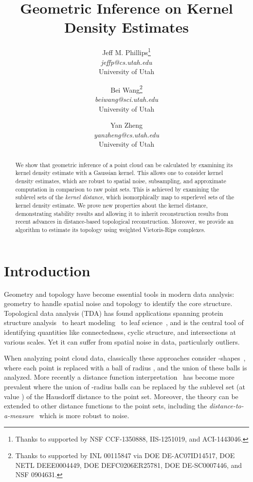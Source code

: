 \documentclass[11pt]{myclass}
\title{Geometric Inference on Kernel Density Estimates}
\author{
Jeff M. Phillips\thanks{Thanks to supported by NSF CCF-1350888, IIS-1251019, and ACI-1443046.}
     \\ {\small\textsl{jeffp@cs.utah.edu}} \\  {\small University of Utah} \and 
Bei Wang\thanks{Thanks to supported by  INL 00115847 via DOE DE-AC07ID14517, 
                                                            DOE NETL DEEE0004449, 
                                                            DOE DEFC0206ER25781, 
                                                            DOE DE-SC0007446, and
                                                            NSF 0904631.}
      \\ {\small\textsl{beiwang@sci.utah.edu}} \\  {\small University of Utah} \and
Yan Zheng \\ {\small\textsl{yanzheng@cs.utah.edu}} \\  {\small University of Utah}
}
\begin{document}
\begin{titlepage}
\maketitle 
\begin{abstract}
We show that geometric inference of a point cloud can be calculated by examining its kernel density estimate with a Gaussian kernel.  This allows one to consider kernel density estimates, which are robust to spatial noise, subsampling, and approximate computation in comparison to raw point sets.  This is achieved by examining the sublevel sets of the \emph{kernel distance}, which isomorphically map to superlevel sets of the kernel density estimate.  We prove new properties about the kernel distance, demonstrating stability results and allowing it to inherit reconstruction results from recent advances in distance-based topological reconstruction.  Moreover, we provide an algorithm to estimate its topology using weighted Vietoris-Rips complexes.
\end{abstract}
\end{titlepage}





\section{Introduction}
\label{sec:intro}

Geometry and topology have become essential tools in modern data analysis: geometry to handle spatial noise and topology to identify the core structure.  Topological data analysis (TDA) has found applications spanning protein structure analysis~\cite{EFFL95,LEFSS98} to heart modeling~\cite{GCZQMA13} to leaf science~\cite{PSMHW11}, and is the central tool of identifying quantities like connectedness, cyclic structure, and intersections at various scales.  Yet it can suffer from spatial noise in data, particularly outliers.  

When analyzing point cloud data, classically these approaches consider -shapes~\cite{Edelsbrunner1993}, where each point is replaced with a ball of radius , and the union of these balls is analyzed.  More recently a distance function interpretation~\cite{CC12} has become more prevalent where the union of -radius balls can be replaced by the sublevel set (at value ) of the Hausdorff distance to the point set.  Moreover, the theory can be extended to other distance functions to the point sets, including the \emph{distance-to-a-measure}~\cite{ChazalCohen-SteinerMerigot2011} which is more robust to noise.  
\end{document}
